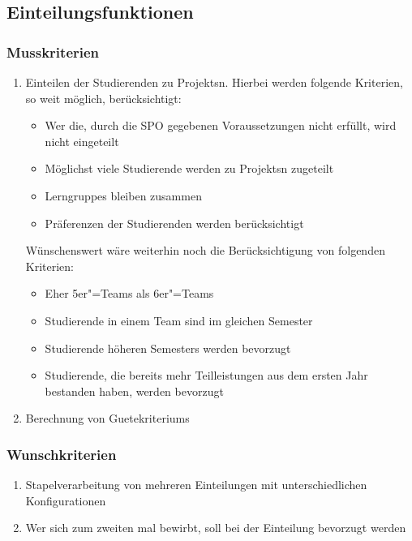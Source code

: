 \documentclass[parskip=full]{scrartcl}
\newcommand{\swtLabel}[1]{\textbf{/#1\arabic*0/}}
\begin{document}
\subsection{Einteilungsfunktionen}
\subsubsection{Musskriterien}
\begin{enumerate}[label=\swtLabel{FA}, resume]
  \item Einteilen der Studierenden zu \glspl{Projekt}n. Hierbei werden folgende
  Kriterien, so weit möglich, berücksichtigt:
  \begin{itemize}
    \item Wer die, durch die \gls{SPO} gegebenen Voraussetzungen nicht erfüllt,
    wird nicht eingeteilt \label{FAeinteilung}
    \item Möglichst viele Studierende werden zu \glspl{Projekt}n zugeteilt 
    \item \glspl{Lerngruppe} bleiben zusammen
    \item Präferenzen der Studierenden werden berücksichtigt
  \end{itemize}
 Wünschenswert wäre weiterhin noch die Berücksichtigung von folgenden Kriterien:  
 \begin{itemize}
   \item Eher 5er"=Teams als 6er"=Teams
   \item Studierende in einem Team sind im gleichen Semester
   \item Studierende höheren Semesters werden bevorzugt
   \item Studierende, die bereits mehr Teilleistungen aus dem ersten Jahr
bestanden haben, werden bevorzugt 
 \end{itemize}
 \item Berechnung von \glspl{Guetekriterium} \label{FAguetekriterien}
\end{enumerate}

 \subsubsection{Wunschkriterien}
 
 \begin{enumerate}[label=\swtLabel{FA}, resume]
 \item Stapelverarbeitung von mehreren Einteilungen mit unterschiedlichen Konfigurationen
 \item Wer sich zum zweiten mal bewirbt, soll bei der Einteilung bevorzugt werden
\end{enumerate}
\end{document}
